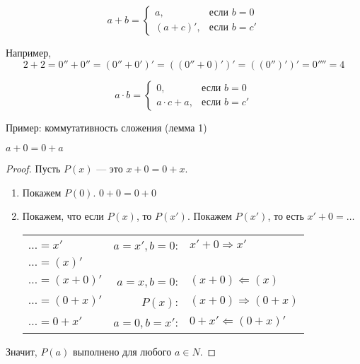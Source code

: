 \begin{definition}
$$a + b = \left\{ \begin{array}{ll} a, & \mbox{если } b = 0\\
                                    (a + c)', & \mbox{если } b = c'
                    \end{array}\right.$$
\end{definition}

Например, $$2 + 2 = 0'' + 0'' =  (0'' + 0')' =  ((0'' + 0)')' =  ((0'')')' = 0'''' = 4$$

\begin{definition}
$$a \cdot b = \left\{ \begin{array}{ll} 0, & \mbox{если } b = 0\\
                                    a \cdot c + a, & \mbox{если } b = c'
                    \end{array}\right.$$
\end{definition}


{Пример: коммутативность сложения (лемма 1)}

\begin{lemma}[1]
    $a + 0 = 0 + a$
\end{lemma}

\begin{proof} Пусть $P(x)$ --- это $x + 0 = 0 + x$.

    \begin{enumerate}
\item Покажем $P(0)$. $0 + 0 = 0 + 0$
\item Покажем, что если $P(x)$, то $P(x')$. Покажем $P(x')$, то есть $x' + 0 = \dots$
\begin{center}
    \begin{tabular}{lrl} %
                        $\dots = x'$ & $a=x',b=0$: & $x' + 0 \Rightarrow x'$ \\
                        $\dots = (x)'$ & \\
                        $\dots = (x + 0)'$ & $a=x,b=0$: &$(x + 0) \Leftarrow (x)$ \\
                        $\dots = (0 + x)'$ & $P(x)$: &$(x + 0) \Rightarrow (0 + x)$ \\
                        $\dots = 0 + x'$ & $a=0,b=x'$: &$0 + x' \Leftarrow (0 + x)'$
    \end{tabular}
\end{center}
\end{enumerate}
Значит, $P(a)$ выполнено для любого $a \in N$.
\end{proof}


